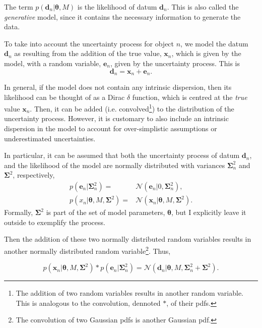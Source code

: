 The term $p(\mathbf{d}_n|\boldsymbol{\theta},M)$ is the likelihood of datum $\mathbf{d}_n$. This is also called the \emph{generative} model, since it contains the necessary information to generate the data. 


To take into account the uncertainty process for object $n$, we model the datum $\mathbf{d}_n$ as resulting from the addition of the true value, $\mathbf{x}_n$, which is given by the model, with a random variable, $\mathbf{e}_n$, given by the uncertainty process. This is
\begin{equation}
\mathbf{d}_n = \mathbf{x}_n + \mathbf{e}_n. \nonumber
\end{equation}

In general, if the model does not contain any intrinsic dispersion, then its likelihood can be thought of as a Dirac $\delta$ function, which is centred at the \emph{true} value $\mathbf{x}_n$. Then, it can be added (i.e. convolved\footnote{The addition of two random variables results in another random variable. This is analogous  to the convolution, dennoted $*$, of their \glspl{pdf}.}) to the distribution of the uncertainty process. However, it is customary to also include an intrinsic dispersion in the model to account for over-simplistic assumptions or underestimated uncertainties. 

In particular, it can be assumed that both the uncertainty process of datum $\mathbf{d}_n$, and the likelihood of the model are normally distributed with variances $\boldsymbol{\Sigma}_n^2$ and $\boldsymbol{\Sigma}^2$, respectively, 
\begin{align}
p(\mathbf{e}_n|\mathbf{\Sigma}_n^2)= &\mathcal{N}(\mathbf{e}_n|0,\boldsymbol{\Sigma}_n^2), \nonumber\\
p(x_n|\boldsymbol{\theta},M,\mathbf{\Sigma}^2)= &\mathcal{N}(\mathbf{x}_n|\boldsymbol{\theta},M,\boldsymbol{\Sigma}^2).\nonumber
\end{align}
Formally, $\boldsymbol{\Sigma}^2$ is part of the set of model parameters, $\boldsymbol{\theta}$, but I explicitly leave it outside to exemplify the process. 

Then the addition of these two normally distributed random variables results in another normally distributed random variable\footnote{The convolution of two Gaussian \glspl{pdf}  is another Gaussian \gls{pdf}.}. Thus,

\begin{equation}
p(\mathbf{x}_n|\boldsymbol{\theta},M,\boldsymbol{\Sigma}^2)*p(\mathbf{e}_n|\boldsymbol{\Sigma}_n^2) = \mathcal{N}(\mathbf{d}_n|\boldsymbol{\theta},M,\boldsymbol{\Sigma}_n^2+\boldsymbol{\Sigma}^2).
\end{equation}


